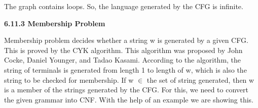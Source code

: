 \documentclass[a4,9pt]{beamer}
\begin{document}
\begin{frame}
\hspace*{0.5cm} The graph contains loops. So, the language generated by the CFG is infinite.\\
\vspace*{0.2cm}

\large{
\textbf{6.11.3 Membership Problem}\\
}

\vspace*{0.2cm}
\small{
Membership problem decides whether a string w is generated by a given CFG.\\
\hspace*{0.5cm} This is proved by the CYK algorithm. This algorithm was proposed by John Cocke, Daniel Younger,
and Tadao Kasami. According to the algorithm, the string of terminals is generated from length 1 to
length of w, which is also the string to be checked for membership. If w $\in$ the set of string generated,
then w is a member of the strings generated by the CFG. For this, we need to convert the given grammar
into CNF. With the help of an example we are showing this.\\
}
\end{frame}
\end{document}
